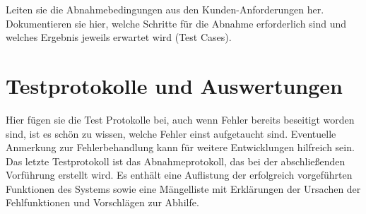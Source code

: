 Leiten sie die Abnahmebedingungen aus den Kunden-Anforderungen her.
Dokumentieren sie hier, welche Schritte für die Abnahme erforderlich
sind und welches Ergebnis jeweils erwartet wird (Test Cases).

\section{Testprotokolle und Auswertungen}

Hier fügen sie die Test Protokolle bei, auch wenn Fehler bereits
beseitigt worden sind, ist es schön zu wissen, welche Fehler einst
aufgetaucht sind. Eventuelle Anmerkung zur Fehlerbehandlung kann für
weitere Entwicklungen hilfreich sein.
Das letzte Testprotokoll ist das Abnahmeprotokoll, das bei der
abschließenden Vorführung erstellt wird. Es enthält eine Auflistung der
erfolgreich vorgeführten Funktionen des Systems sowie eine Mängelliste
mit Erklärungen der Ursachen der Fehlfunktionen und Vorschlägen zur
Abhilfe.

